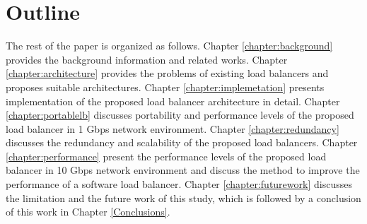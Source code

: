 \section{Outline}

The rest of the paper is organized as follows.
Chapter \ref{chapter:background} provides the background information and related works.
Chapter \ref{chapter:architecture} provides the problems of existing load balancers and proposes suitable architectures.
Chapter \ref{chapter:implemetation} presents implementation of the proposed load balancer architecture in detail.
Chapter \ref{chapter:portablelb} discusses portability and performance levels of the proposed load balancer in 1 Gbps network environment.
Chapter \ref{chapter:redundancy} discusses the redundancy and scalability of the proposed load balancers.
Chapter \ref{chapter:performance} present the performance levels of the proposed load balancer in 10 Gbps network environment and discuss the method to improve the performance of a software load balancer.
Chapter \ref{chapter:futurework} discusses the limitation and the future work of this study,
which is followed by a conclusion of this work in Chapter \ref{Conclusions}.





